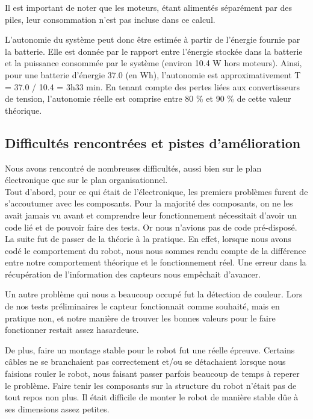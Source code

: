 \documentclass[11pt,a4paper]{article}
\begin{document}
\vspace{1mm}

Il est important de noter que les moteurs, étant alimentés séparément par des piles, leur consommation n’est pas incluse dans ce calcul.

\vspace{2mm}

L’autonomie du système peut donc être estimée à partir de l’énergie fournie par la batterie.
Elle est donnée par le rapport entre l’énergie stockée dans la batterie et la puissance consommée par le système (environ 10.4 W hors moteurs).
Ainsi, pour une batterie d’énergie 37.0 (en Wh), l’autonomie est approximativement T = 37.0 / 10.4 = 3h33 min. En tenant compte des pertes liées aux convertisseurs de tension, l’autonomie réelle est comprise entre 80 \% et 90 \% de cette valeur théorique.


\subsection{Difficultés rencontrées et pistes d'amélioration}

Nous avons rencontré de nombreuses difficultés, aussi bien sur le plan électronique que sur le plan organisationnel.\\

Tout d'abord, pour ce qui était de l'électronique, les premiers problèmes furent de s'accoutumer avec les composants. 
Pour la majorité des composants, on ne les avait jamais vu avant et comprendre leur fonctionnement nécessitait d'avoir un code lié et de pouvoir faire des tests. Or nous n'avions pas de code pré-disposé.
La suite fut de passer de la théorie à la pratique. 
En effet, lorsque nous avons codé le comportement du robot, nous nous sommes rendu compte de la différence entre notre comportement théorique et le fonctionnement réel. 
Une erreur dans la récupération de l'information des capteurs nous empêchait d'avancer. 

Un autre problème qui nous a beaucoup occupé fut la détection de couleur. 
Lors de nos tests préliminaires le capteur fonctionnait comme souhaité, mais en pratique non, et notre manière de trouver les bonnes valeurs pour le faire fonctionner restait assez hasardeuse.

De plus, faire un montage stable pour le robot fut une réelle épreuve. 
Certains câbles ne se branchaient pas correctement et/ou se détachaient lorsque nous faisions rouler le robot, nous faisant passer parfois beaucoup de temps à reperer le problème. 
Faire tenir les composants sur la structure du robot n'était pas de tout repos non plus. 
Il était difficile de monter le robot de manière stable dûe à ses dimensions assez petites.\\
\end{document}
